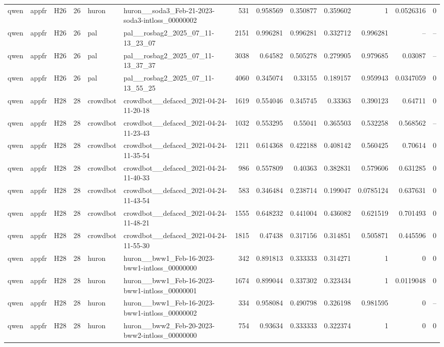 \begin{longtable}{lllrllrrrrrrr}
qwen & appfr & H26 & 26 & huron & huron\_\_soda3\_Feb-21-2023-soda3-intloss\_00000002 & 531 & 0.958569 & 0.350877 & 0.359602 & 1 & 0.0526316 & 0 \\
qwen & appfr & H26 & 26 & pal & pal\_\_rosbag2\_2025\_07\_11-13\_23\_07 & 2151 & 0.996281 & 0.996281 & 0.332712 & 0.996281 & -- & -- \\
qwen & appfr & H26 & 26 & pal & pal\_\_rosbag2\_2025\_07\_11-13\_37\_37 & 3038 & 0.64582 & 0.505278 & 0.279905 & 0.979685 & 0.03087 & -- \\
qwen & appfr & H26 & 26 & pal & pal\_\_rosbag2\_2025\_07\_11-13\_55\_25 & 4060 & 0.345074 & 0.33155 & 0.189157 & 0.959943 & 0.0347059 & 0 \\
qwen & appfr & H28 & 28 & crowdbot & crowdbot\_\_defaced\_2021-04-24-11-20-18 & 1619 & 0.554046 & 0.345745 & 0.33363 & 0.390123 & 0.64711 & 0 \\
qwen & appfr & H28 & 28 & crowdbot & crowdbot\_\_defaced\_2021-04-24-11-23-43 & 1032 & 0.553295 & 0.55041 & 0.365503 & 0.532258 & 0.568562 & -- \\
qwen & appfr & H28 & 28 & crowdbot & crowdbot\_\_defaced\_2021-04-24-11-35-54 & 1211 & 0.614368 & 0.422188 & 0.408142 & 0.560425 & 0.70614 & 0 \\
qwen & appfr & H28 & 28 & crowdbot & crowdbot\_\_defaced\_2021-04-24-11-40-33 & 986 & 0.557809 & 0.40363 & 0.382831 & 0.579606 & 0.631285 & 0 \\
qwen & appfr & H28 & 28 & crowdbot & crowdbot\_\_defaced\_2021-04-24-11-43-54 & 583 & 0.346484 & 0.238714 & 0.199047 & 0.0785124 & 0.637631 & 0 \\
qwen & appfr & H28 & 28 & crowdbot & crowdbot\_\_defaced\_2021-04-24-11-48-21 & 1555 & 0.648232 & 0.441004 & 0.436082 & 0.621519 & 0.701493 & 0 \\
qwen & appfr & H28 & 28 & crowdbot & crowdbot\_\_defaced\_2021-04-24-11-55-30 & 1815 & 0.47438 & 0.317156 & 0.314851 & 0.505871 & 0.445596 & 0 \\
qwen & appfr & H28 & 28 & huron & huron\_\_bww1\_Feb-16-2023-bww1-intloss\_00000000 & 342 & 0.891813 & 0.333333 & 0.314271 & 1 & 0 & 0 \\
qwen & appfr & H28 & 28 & huron & huron\_\_bww1\_Feb-16-2023-bww1-intloss\_00000001 & 1674 & 0.899044 & 0.337302 & 0.323434 & 1 & 0.0119048 & 0 \\
qwen & appfr & H28 & 28 & huron & huron\_\_bww1\_Feb-16-2023-bww1-intloss\_00000002 & 334 & 0.958084 & 0.490798 & 0.326198 & 0.981595 & 0 & -- \\
qwen & appfr & H28 & 28 & huron & huron\_\_bww2\_Feb-20-2023-bww2-intloss\_00000000 & 754 & 0.93634 & 0.333333 & 0.322374 & 1 & 0 & 0 \\

\end{longtable}
